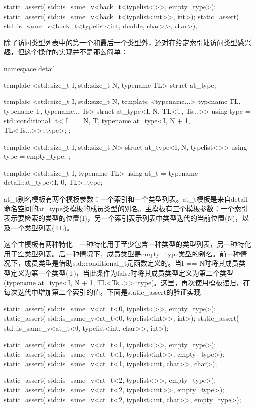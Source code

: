 \begin{cpp}
static_assert(
	std::is_same_v<back_t<typelist<>>, empty_type>);
static_assert(
	std::is_same_v<back_t<typelist<int>>, int>);
static_assert(
	std::is_same_v<back_t<typelist<int, double, char>>,
				   char>);
\end{cpp}

除了访问类型列表中的第一个和最后一个类型外，还对在给定索引处访问类型感兴趣，但这个操作的实现并不是那么简单：

\begin{cpp}
namespace detail
{
	template <std::size_t I, std::size_t N, typename TL>
	struct at_type;
	
	template <std::size_t I, std::size_t N,
			  template <typename...> typename TL,
			  typename T, typename... Ts>
	struct at_type<I, N, TL<T, Ts...>>
	{
		using type =
		std::conditional_t<
		I == N,
		T,
		typename at_type<I, N + 1, TL<Ts...>>::type>;
	};

	template <std::size_t I, std::size_t N>
	struct at_type<I, N, typelist<>>
	{
		using type = empty_type;
	};
}

template <std::size_t I, typename TL>
using at_t = typename detail::at_type<I, 0, TL>::type;
\end{cpp}

at\_t别名模板有两个模板参数：一个索引和一个类型列表。at\_t模板是来自detail命名空间的at\_type类模板的成员类型的别名。主模板有三个模板参数：一个索引表示要检索的类型的位置(I)，另一个索引表示列表中类型迭代的当前位置(N)，以及一个类型列表(TL)。

这个主模板有两种特化：一种特化用于至少包含一种类型的类型列表，另一种特化用于空类型列表。后一种情况下，成员类型是empty\_type类型的别名。前一种情况下，成员类型是借助std::conditional\_t元函数定义的。当I == N时将其成员类型定义为第一个类型(T)，当此条件为false时将其成员类型定义为第二个类型(typename at\_type<I, N + 1, TL<Ts…>{}>::type)。这里，再次使用模板递归，在每次迭代中增加第二个索引的值。下面是static\_assert的验证实现：

\begin{cpp}
static_assert(
	std::is_same_v<at_t<0, typelist<>>, empty_type>);
static_assert(
	std::is_same_v<at_t<0, typelist<int>>, int>);
static_assert(
	std::is_same_v<at_t<0, typelist<int, char>>, int>);
	
static_assert(
	std::is_same_v<at_t<1, typelist<>>, empty_type>);
static_assert(
	std::is_same_v<at_t<1, typelist<int>>, empty_type>);
static_assert(
	std::is_same_v<at_t<1, typelist<int, char>>, char>);
	
static_assert(
	std::is_same_v<at_t<2, typelist<>>, empty_type>);
static_assert(
	std::is_same_v<at_t<2, typelist<int>>, empty_type>);
static_assert(
	std::is_same_v<at_t<2, typelist<int, char>>,
				   empty_type>);
\end{cpp}

